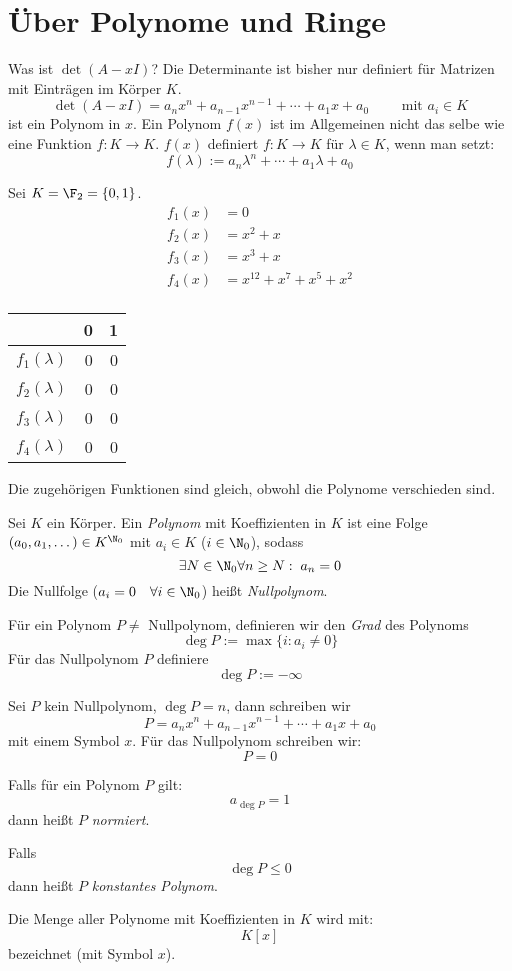 \documentclass{mycourse}
\begin{document}
\section{Über Polynome und Ringe}

Was ist $\det(A-xI)$?
Die Determinante ist bisher nur definiert für Matrizen mit Einträgen im Körper $K$.
\[
\det(A-xI)=a_nx^n+a_{n-1}x^{n-1}+\dotsb+a_1x+a_0 \qquad \text{ mit }a_i \in K
\]
ist ein Polynom in $x$.
Ein Polynom $f(x)$ ist im Allgemeinen nicht das selbe wie eine Funktion $f:K\to K$.
$f(x)$ definiert $f:K\to K$ für $\lambda\in K$, wenn man setzt:
\[
f(\lambda):= a_n\lambda^n+\dotsb+a_1\lambda+a_0
\]

\begin{ex}
Sei $K=\F_2=\{0,1\}$.
\begin{align*}
f_1(x)&=0\\
f_2(x)&=x^2+x\\
f_3(x)&=x^3+x\\
f_4(x)&=x^{12}+x^{7}+x^5+x^2\\
\end{align*}
\begin{table}[h]
\begin{tabular}{l|r|r}
 & 0 & 1\\
\hline
$f_1(\lambda)$ & 0 & 0\\
$f_2(\lambda)$ & 0 & 0\\
$f_3(\lambda)$ & 0 & 0\\
$f_4(\lambda)$ & 0 & 0
\end{tabular}
\end{table}

Die zugehörigen Funktionen sind gleich, obwohl die Polynome verschieden sind.
\end{ex}

\begin{df}
\label{df:10.6}
Sei $K$ ein Körper.
Ein \emph{Polynom} mit Koeffizienten in $K$ ist eine Folge $(a_0, a_1, \dotsc)\in K^{\N_0}$ mit
$a_i\in K$ ($i\in \N_0$), sodass
\[
\exists N\in \N_0 \forall n\ge N:\; a_n=0
\]
Die Nullfolge ($a_i=0 \quad\forall i\in\N_0$) heißt \emph{Nullpolynom}.

Für ein Polynom $P\neq$ Nullpolynom, definieren wir den \emph{Grad} des Polynoms
\[
\deg P:= \max\{i:a_i\neq 0\}
\]
Für das Nullpolynom $P$ definiere
\[
\deg P:= -\infty
\]

Sei $P$ kein Nullpolynom, $\deg P=n$, dann schreiben wir
\[
P=a_nx^n + a_{n-1}x^{n-1} + \dotsb + a_1x + a_0
\]
mit einem Symbol $x$.
Für das Nullpolynom schreiben wir:
\[
P=0
\]

Falls für ein Polynom $P$ gilt:
\[
a_{\deg P}=1
\]
dann heißt $P$ \emph{normiert}.

Falls
\[
\deg P\le 0
\]
dann heißt $P$ \emph{konstantes Polynom}.

Die Menge aller Polynome mit Koeffizienten in $K$ wird mit:
\[
K[x]
\]
bezeichnet (mit Symbol $x$).
\end{df}
\end{document}
